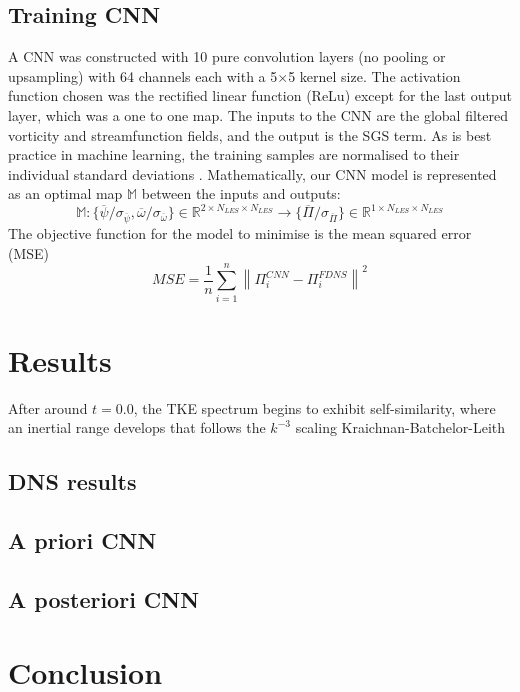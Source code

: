 \documentclass[conf]{new-aiaa}
\begin{document}
\subsection{Training CNN}
A CNN was constructed with 10 pure convolution layers (no pooling or upsampling) with 64 channels each with a 5$\times$5 kernel size. The activation function chosen was the rectified linear function (ReLu) except for the last output layer, which was a one to one map.
The inputs to the CNN are the global filtered vorticity and streamfunction fields, and the output is the SGS term. As is best practice in machine learning, the training samples are normalised to their individual standard deviations \cite{MLstandardise}. Mathematically, our CNN model is represented as an optimal map $\mathbb{M} $ between the inputs and outputs:
\begin{equation}
    \mathbb{M} : {\{ \overline{\psi}/\sigma_{\overline{\psi}},\overline{\omega}/\sigma_{\overline{\omega}}\}\in \mathbb{R}^{2\times N_{LES}\times N_{LES}} \rightarrow \{ \overline{\Pi}/\sigma_{\overline{\Pi}}\}\in \mathbb{R}^{1\times N_{LES}\times N_{LES}}}
\end{equation}
The objective function for the model to minimise is the mean squared error (MSE) 
\begin{equation}
    MSE = \frac{1}{n}\sum_{i = 1}^{n}\left\lVert \Pi^{CNN}_{i} - \Pi^{FDNS}_{i} \right\rVert ^{2}
\end{equation}
\section{Results}
After around $t=0.0$, the TKE spectrum begins to exhibit self-similarity, where an inertial range develops that follows the $k^{-3}$ scaling Kraichnan-Batchelor-Leith
\subsection{DNS results}
\subsection{A priori CNN}
\subsection{A posteriori CNN}




\section{Conclusion}
\end{document}
